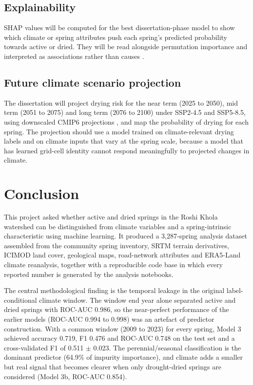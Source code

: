 \documentclass[12pt,a4paper]{article}
\begin{document}
\subsection{Explainability}

SHAP values \citep{lundberg2017} will be computed for the best dissertation-phase model to show which climate or spring attributes push each spring's predicted probability towards active or dried. They will be read alongside permutation importance and interpreted as associations rather than causes \citep{strobl2007}.

\subsection{Future climate scenario projection}

The dissertation will project drying risk for the near term (2025 to 2050), mid term (2051 to 2075) and long term (2076 to 2100) under SSP2-4.5 and SSP5-8.5, using downscaled CMIP6 projections \citep{thrasher2022}, and map the probability of drying for each spring. The projection should use a model trained on climate-relevant drying labels and on climate inputs that vary at the spring scale, because a model that has learned grid-cell identity cannot respond meaningfully to projected changes in climate.

\clearpage
\section{Conclusion}\label{sec:conclusion}

This project asked whether active and dried springs in the Roshi Khola watershed can be distinguished from climate variables and a spring-intrinsic characteristic using machine learning. It produced a 3,287-spring analysis dataset assembled from the community spring inventory, SRTM terrain derivatives, ICIMOD land cover, geological maps, road-network attributes and ERA5-Land climate reanalysis, together with a reproducible code base in which every reported number is generated by the analysis notebooks.

The central methodological finding is the temporal leakage in the original label-conditional climate window. The window end year alone separated active and dried springs with ROC-AUC 0.986, so the near-perfect performance of the earlier models (ROC-AUC 0.994 to 0.998) was an artefact of predictor construction. With a common window (2009 to 2023) for every spring, Model 3 achieved accuracy 0.719, F1 0.476 and ROC-AUC 0.748 on the test set and a cross-validated F1 of 0.511 $\pm$ 0.023. The perennial/seasonal classification is the dominant predictor (64.9\% of impurity importance), and climate adds a smaller but real signal that becomes clearer when only drought-dried springs are considered (Model 3b, ROC-AUC 0.854).
\end{document}
